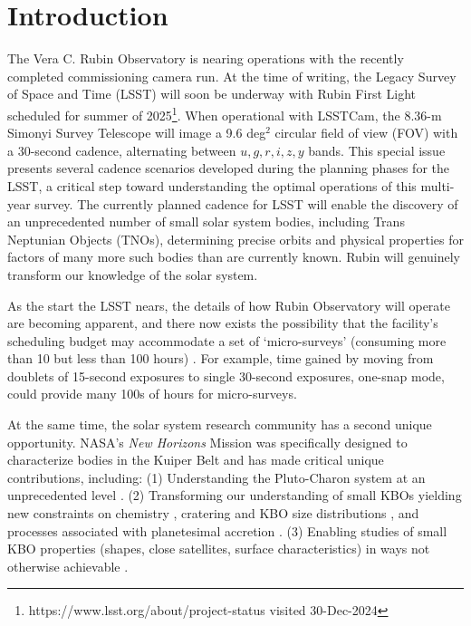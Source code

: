 \documentclass[modern,linenumbers,trackchanges,preprint]{aastex631}
\begin{document}
\section{Introduction}
The Vera C. Rubin Observatory is nearing operations with the recently completed commissioning camera run. At the time of writing, the Legacy Survey of Space and Time (LSST) will soon be underway with Rubin First Light scheduled for summer of 2025\footnote{https://www.lsst.org/about/project-status visited 30-Dec-2024}. 
When operational with LSSTCam, the 8.36-m Simonyi Survey Telescope will image a 9.6 deg$^2$ circular field of view (FOV) with a 30-second cadence, alternating between $u,g,r,i,z,y$ bands.  
This special issue presents several cadence scenarios developed during the planning phases for the LSST, a critical step toward understanding the optimal operations of this multi-year survey.
The currently planned cadence for LSST  will enable the discovery of an unprecedented number of small solar system bodies, including Trans Neptunian Objects (TNOs), determining precise orbits and physical properties for factors of many more such bodies than are currently known. 
Rubin will genuinely transform our knowledge of the solar system.

As the start the LSST nears, the details of how Rubin Observatory will operate are becoming apparent, and there now exists the possibility that the facility's scheduling budget may accommodate a set of `micro-surveys' (consuming more than 10 but less than 100 hours) .
For example, time gained by moving from doublets of 15-second exposures to single 30-second exposures, one-snap mode, could provide many 100s of hours for micro-surveys.

At the same time, the solar system research community has a second unique opportunity. 
NASA's {\it New Horizons} Mission was specifically designed to characterize bodies in the Kuiper Belt and has made critical unique contributions, including: (1) Understanding the Pluto-Charon system at an unprecedented level \citep[e.g.][]{Stern2019, Stern2015, DESCH2017, WONG2017, KRASNOPOLSKY2020}.
(2) Transforming our understanding of small KBOs \citep{Stern2019} yielding new constraints on chemistry \citep{Grundy2020}, cratering and KBO size distributions \citep{Singer2019, Robbins21}, and processes associated with planetesimal accretion \citep[e.g.][]{Nesvorny2021, Nesvorny2022, Nesvorny2023, Nesvorny2023PSJ, Stern2019, Stern2023, McKinnon2020}. (3) Enabling studies of small KBO properties (shapes, close satellites, surface characteristics) in ways not otherwise achievable \citep{Porter2016, Verbiscer2019, Verbiscer2022}. 
\end{document}
